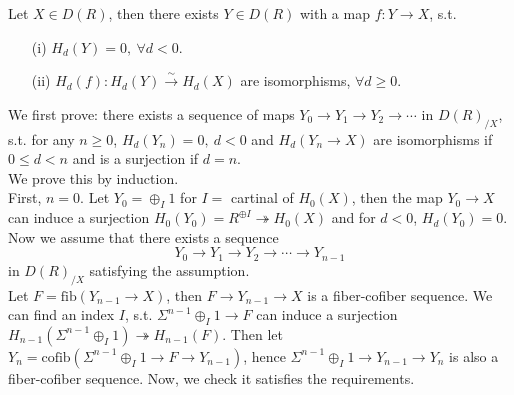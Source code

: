 \documentclass[UTF8,12,a4paper]{ctexart}
\theoremstyle{definition}
\begin{document}
\prop \label{truncation}
Let $X\in D(R)$, then there exists $Y\in D(R)$ with a map $f:Y\rightarrow X$, s.t.
\begin{itemize}
	\item [(i)] $H_d(Y)=0,\ \forall d<0.$
	\item [(ii)] $H_d(f): H_d(Y)\stackrel{\sim}{\longrightarrow} H_d(X)$ are isomorphisms, $\forall d\geq 0.$
\end{itemize}
\pf 
We first prove: there exists a sequence of maps $Y_0\rightarrow Y_1\rightarrow Y_2\rightarrow\cdots$ in $D(R)_{/X}$, s.t. for any $n\geq 0$, $H_d(Y_n)=0,\ d<0$ and $H_d(Y_n\rightarrow X) $ are isomorphisms if $0\leq d<n$ and is a surjection if $d=n$.\\
We prove this by induction.\\
First, $n=0$. Let $Y_0=\oplus_I 1$ for $I=$ cartinal of $H_0(X)$,
 then the map $Y_0\to X$ can induce a surjection $H_0(Y_0)=R^{\oplus I}\twoheadrightarrow H_0(X)$ and for $d<0$, $H_d(Y_0)=0.$\\
 Now we assume that there exists a sequence
 $$Y_0\rightarrow Y_1\rightarrow Y_2\rightarrow\cdots\rightarrow Y_{n-1}$$
in $D(R)_{/X}$ satisfying the assumption.\\
Let $F=\text{fib}(Y_{n-1}\to X)$, then $F\to Y_{n-1}\to X$ is a fiber-cofiber sequence. We can find an index $I$, s.t. $\Sigma^{n-1}\oplus_I 1\rightarrow F$ can induce a surjection $H_{n-1}(\Sigma^{n-1}\oplus_I 1)\twoheadrightarrow H_{n-1}(F)$. Then let $Y_n=\text{cofib}(\Sigma^{n-1}\oplus_I 1\to F\to Y_{n-1})$, hence $\Sigma^{n-1}\oplus_I 1\to Y_{n-1}\to Y_n$ is also a fiber-cofiber sequence. Now, we check it satisfies the requirements.
\end{document}

